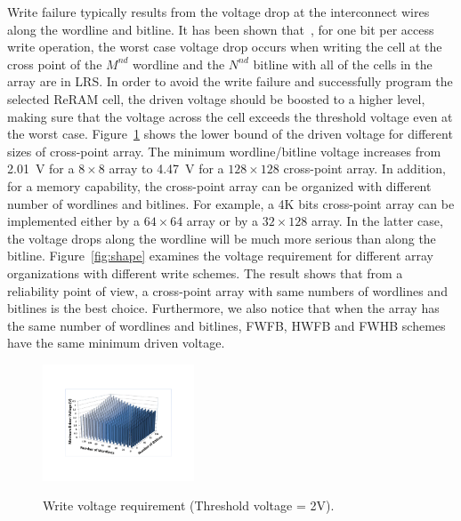 Write failure typically results from the voltage drop at the interconnect
wires along the wordline and bitline. It has been shown
that~\cite{crossbar_TED_2010}, for one bit per access write operation, the
worst case voltage drop occurs when writing the cell at the cross point of
the $M^{nd}$ wordline and the $N^{nd}$ bitline with all of the cells in
the array are in LRS. In order to avoid the write failure and successfully
program the selected ReRAM cell, the driven voltage should be boosted to a
higher level, making sure that the voltage across the cell exceeds the
threshold voltage even at the worst case. Figure~\ref{fig:worst_v} shows
the lower bound of the driven voltage for different sizes of cross-point
array. The minimum wordline/bitline voltage increases from 2.01~V for a $8
\times 8$ array to 4.47~V for a $128 \times 128$ cross-point array. In
addition, for a memory capability, the cross-point array can be organized
with different number of wordlines and bitlines. For example, a 4K bits
cross-point array can be implemented either by a $64 \times 64$ array or
by a $32 \times 128$ array. In the latter case, the voltage drops along
the wordline will be much more serious than along the bitline.
Figure~\ref{fig:shape} examines the voltage requirement for different
array organizations with different write schemes. The result shows that
from a reliability point of view, a cross-point array with same numbers of
wordlines and bitlines is the best choice. Furthermore, we also notice
that when the array has the same number of wordlines and bitlines, FWFB,
HWFB and FWHB schemes have the same minimum driven voltage.


\begin{figure}%
\centering
  \includegraphics[width=0.4\textwidth]{./figures/worst_v_f.pdf}\\
  \caption{Write voltage requirement (Threshold voltage = 2V). }\label{fig:worst_v}
  \vspace{-5pt}
\end{figure}


